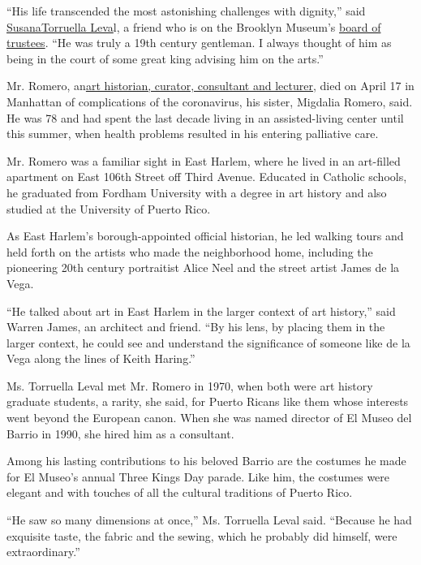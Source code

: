 ``His life transcended the most astonishing challenges with dignity,''
said
\href{https://www.brooklynmuseum.org/about/board_of_trustees}{Susana}\href{https://www.imls.gov/susana-torruella-leval}{Torruella
Leva}l, a friend who is on the Brooklyn Museum's
\href{https://www.artnews.com/art-news/news/brooklyn-museum-adds-three-to-board-of-trustees-9241/}{board
of trustees}. ``He was truly a 19th century gentleman. I always thought
of him as being in the court of some great king advising him on the
arts.''

Mr. Romero,
an\href{https://centropr.hunter.cuny.edu/centrovoices/current-affairs/remembering-mario-cesar-romero}{art
historian, curator, consultant and lecturer,} died on April 17 in
Manhattan of complications of the coronavirus, his sister, Migdalia
Romero, said. He was 78 and had spent the last decade living in an
assisted-living center until this summer, when health problems resulted
in his entering palliative care.

Mr. Romero was a familiar sight in East Harlem, where he lived in an
art-filled apartment on East 106th Street off Third Avenue. Educated in
Catholic schools, he graduated from Fordham University with a degree in
art history and also studied at the University of Puerto Rico.

As East Harlem's borough-appointed official historian, he led walking
tours and held forth on the artists who made the neighborhood home,
including the pioneering 20th century portraitist Alice Neel and the
street artist James de la Vega.

``He talked about art in East Harlem in the larger context of art
history,'' said Warren James, an architect and friend. ``By his lens, by
placing them in the larger context, he could see and understand the
significance of someone like de la Vega along the lines of Keith
Haring.''

Ms. Torruella Leval met Mr. Romero in 1970, when both were art history
graduate students, a rarity, she said, for Puerto Ricans like them whose
interests went beyond the European canon. When she was named director of
El Museo del Barrio in 1990, she hired him as a consultant.

Among his lasting contributions to his beloved Barrio are the costumes
he made for El Museo's annual Three Kings Day parade. Like him, the
costumes were elegant and with touches of all the cultural traditions of
Puerto Rico.

``He saw so many dimensions at once,'' Ms. Torruella Leval said.
``Because he had exquisite taste, the fabric and the sewing, which he
probably did himself, were extraordinary.''

